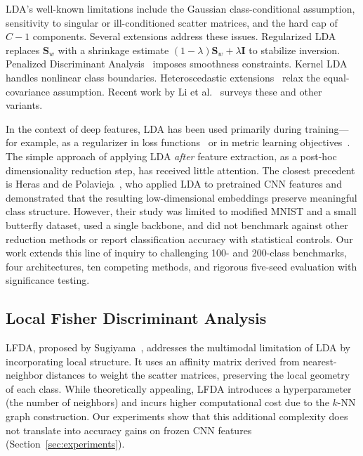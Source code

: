LDA's well-known limitations include the Gaussian class-conditional assumption, sensitivity to singular or ill-conditioned scatter matrices, and the hard cap of $C-1$ components. Several extensions address these issues. Regularized LDA~\cite{friedman1989regularized} replaces $\mathbf{S}_w$ with a shrinkage estimate $(1-\lambda)\mathbf{S}_w + \lambda\mathbf{I}$ to stabilize inversion. Penalized Discriminant Analysis~\cite{hastie1995penalized} imposes smoothness constraints. Kernel LDA~\cite{mika1999fisher} handles nonlinear class boundaries. Heteroscedastic extensions~\cite{loog2004lda_review} relax the equal-covariance assumption. Recent work by Li et al.~\cite{li2022survey_dr} surveys these and other variants.

In the context of deep features, LDA has been used primarily during training---for example, as a regularizer in loss functions~\cite{dorfer2016deep_lda} or in metric learning objectives~\cite{wen2016discriminative}. The simple approach of applying LDA \emph{after} feature extraction, as a post-hoc dimensionality reduction step, has received little attention. The closest precedent is Heras and de Polavieja~\cite{heras2020lda_cnn}, who applied LDA to pretrained CNN features and demonstrated that the resulting low-dimensional embeddings preserve meaningful class structure. However, their study was limited to modified MNIST and a small butterfly dataset, used a single backbone, and did not benchmark against other reduction methods or report classification accuracy with statistical controls. Our work extends this line of inquiry to challenging 100- and 200-class benchmarks, four architectures, ten competing methods, and rigorous five-seed evaluation with significance testing.

\subsection{Local Fisher Discriminant Analysis}

LFDA, proposed by Sugiyama~\cite{sugiyama2007lfda}, addresses the multimodal limitation of LDA by incorporating local structure. It uses an affinity matrix derived from nearest-neighbor distances to weight the scatter matrices, preserving the local geometry of each class. While theoretically appealing, LFDA introduces a hyperparameter (the number of neighbors) and incurs higher computational cost due to the $k$-NN graph construction. Our experiments show that this additional complexity does not translate into accuracy gains on frozen CNN features (Section~\ref{sec:experiments}).

